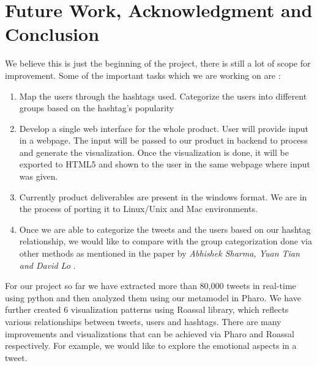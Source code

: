 \documentclass[11pt]{article}
\begin{document}
\section{Future Work, Acknowledgment and Conclusion}

We believe this is just the beginning of the project, there is still a lot of scope for improvement. Some of the important tasks which we are working on are :
\begin{enumerate}
\item Map the users through the hashtags used. Categorize the users into different groups based on the hashtag's popularity
\item Develop a single web interface for the whole product. User will provide input in a webpage. The input will be passed to our product in backend to process and generate the visualization. Once the visualization is done, it will be exported to HTML5 and shown to the user in the same webpage where input was given.
\item Currently product deliverables are present in the windows format. We are in the process of porting it to Linux/Unix and Mac environments.
\item Once we are able to categorize the tweets and the users based on our hashtag relationship, we would like to compare with the group categorization done via other methods as mentioned in the paper by \textit{Abhishek Sharma, Yuan Tian and David Lo}\cite{sehotintwitter} .
\end{enumerate}

For our project so far we have extracted more than 80,000 tweets in real-time using python and then analyzed them using our metamodel in Pharo. We have further created 6 visualization patterns using Roassal library, which reflects various relationships between tweets, users and hashtags. There are many improvements and visualizations that can be achieved via Pharo and Roassal respectively. For example, we would like to explore the emotional aspects in a tweet.
\end{document}
